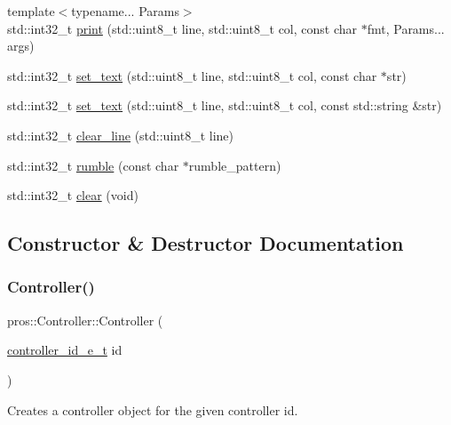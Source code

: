 \begin{DoxyCompactItemize}
\item 
{\footnotesize template$<$typename... Params$>$ }\\std\+::int32\+\_\+t \hyperlink{classpros_1_1Controller_a4a301df3d34578661271f9b400da1176}{print} (std\+::uint8\+\_\+t line, std\+::uint8\+\_\+t col, const char $\ast$fmt, Params... args)
\item 
std\+::int32\+\_\+t \hyperlink{classpros_1_1Controller_a2ec84a072d09a4bb39253956662604cd}{set\+\_\+text} (std\+::uint8\+\_\+t line, std\+::uint8\+\_\+t col, const char $\ast$str)
\item 
std\+::int32\+\_\+t \hyperlink{classpros_1_1Controller_a78122fe7bb18921a4c2de2e762e87c1c}{set\+\_\+text} (std\+::uint8\+\_\+t line, std\+::uint8\+\_\+t col, const std\+::string \&str)
\item 
std\+::int32\+\_\+t \hyperlink{classpros_1_1Controller_a9f65f6c26d55619a658aa103d3532583}{clear\+\_\+line} (std\+::uint8\+\_\+t line)
\item 
std\+::int32\+\_\+t \hyperlink{classpros_1_1Controller_ac2436bc570bdce79da5954eb895fd234}{rumble} (const char $\ast$rumble\+\_\+pattern)
\item 
std\+::int32\+\_\+t \hyperlink{classpros_1_1Controller_a49a332fe032c3aaf94e24bb3a51945e1}{clear} (void)
\end{DoxyCompactItemize}


\subsection{Constructor \& Destructor Documentation}
\mbox{\label{classpros_1_1Controller_ae9d9ead11894048b383e9e82ef46d5ad}} 
\subsubsection{\texorpdfstring{Controller()}{Controller()}}
{\footnotesize\ttfamily pros\+::\+Controller\+::\+Controller (\begin{DoxyParamCaption}\item[{\hyperlink{misc_8h_af1323f00203099060d46f722b1fbd460}{controller\+\_\+id\+\_\+e\+\_\+t}}]{id }\end{DoxyParamCaption})}

Creates a controller object for the given controller id.


